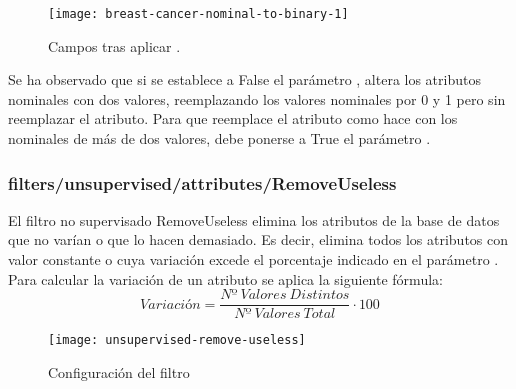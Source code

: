 \begin{figure}[ht]
    \centering
    \texttt{[image: breast-cancer-nominal-to-binary-1]}
    \caption{Campos tras aplicar .}
    \label{fig:breast-cancer-nominal-to-binary-1}
\end{figure}

Se ha observado que si se establece a False el parámetro \code{}, altera los atributos nominales con dos valores, reemplazando los valores nominales por 0 y 1 pero sin reemplazar el atributo. Para que reemplace el atributo como hace con los nominales de más de dos valores, debe ponerse a True el parámetro .

\subsubsection{filters/unsupervised/attributes/RemoveUseless}
El filtro no supervisado RemoveUseless elimina los atributos de la base de datos que no varían o que lo hacen demasiado. Es decir, elimina todos los atributos con valor constante o cuya variación excede el porcentaje indicado en el parámetro . Para calcular la variación de un atributo se aplica la siguiente fórmula:
\begin{equation*}
Variación=\dfrac{Nº\ Valores\ Distintos}{Nº\ Valores\ Total}\cdot100
\end{equation*}

\begin{figure}[ht]
    \centering
    \texttt{[image: unsupervised-remove-useless]}
    \caption{Configuración del filtro }
    \label{fig:unsupervised-remove-useless}
\end{figure}

